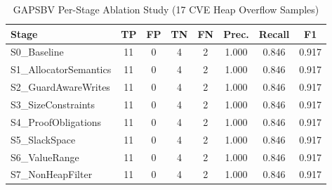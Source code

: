 \begin{table}[htbp]
\centering
\caption{GAPSBV Per-Stage Ablation Study (17 CVE Heap Overflow Samples)}
\label{tab:ablation}
\begin{tabular}{lccccccc}
\toprule
Stage & TP & FP & TN & FN & Prec. & Recall & F1 \\
\midrule
    S0_Baseline & 11 & 0 & 4 & 2 & 1.000 & 0.846 & 0.917 \\
    S1_AllocatorSemantics & 11 & 0 & 4 & 2 & 1.000 & 0.846 & 0.917 \\
    S2_GuardAwareWrites & 11 & 0 & 4 & 2 & 1.000 & 0.846 & 0.917 \\
    S3_SizeConstraints & 11 & 0 & 4 & 2 & 1.000 & 0.846 & 0.917 \\
    S4_ProofObligations & 11 & 0 & 4 & 2 & 1.000 & 0.846 & 0.917 \\
    S5_SlackSpace & 11 & 0 & 4 & 2 & 1.000 & 0.846 & 0.917 \\
    S6_ValueRange & 11 & 0 & 4 & 2 & 1.000 & 0.846 & 0.917 \\
    S7_NonHeapFilter & 11 & 0 & 4 & 2 & 1.000 & 0.846 & 0.917 \\
\bottomrule
\end{tabular}
\end{table}
